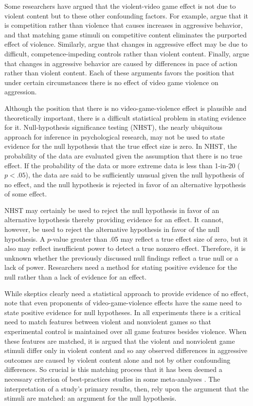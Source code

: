 \documentclass[man]{apa6}
\begin{document}
Some researchers have argued that the violent-video game effect is not due to violent content but to these other confounding factors.  For example, \citet{Adachi:Willoughby:2011} argue that it is competition rather than violence that causes increases in aggressive behavior, and that matching game stimuli on competitive content eliminates the purported effect of violence. Similarly, \citet{Przybylski:etal:2014} argue that changes in aggressive effect may be due to difficult, competence-impeding controls rather than violent content. Finally,  \citet{Elson:etal:2013} argue that changes in aggressive behavior are caused by differences in pace of action rather than violent content. Each of these arguments favors the position that under certain circumstances there is no effect of video game violence on aggression.

Although the position that there is no video-game-violence effect is plausible and theoretically important, there is a difficult statistical problem in stating evidence for it. Null-hypothesis significance testing (NHST), the nearly ubiquitous approach for inference in psychological research, may not be used to state evidence for the null hypothesis that the true effect size is zero.  In NHST, the probability of the data are evaluated given the assumption that there is no true effect. If the probability of the data or more extreme data is less than 1-in-20 ($p<.05$), the data are said to be sufficiently unusual given the null hypothesis of no effect, and the null hypothesis is rejected in favor of an alternative hypothesis of some effect.

NHST may certainly be used to reject the null hypothesis in favor of an alternative hypothesis thereby providing evidence for an effect.  It cannot, however, be used to  reject the alternative hypothesis in favor of the null hypothesis. A $p$-value greater than .05 may reflect a true effect size of zero, but it also may reflect insufficient power to detect a true nonzero effect. Therefore, it is unknown whether the previously discussed null findings reflect a true null or a lack of power.  Researchers need a method for stating positive evidence for the null rather than a lack of evidence for an effect.

While skeptics clearly need a statistical approach to provide evidence of no effect, note that even proponents of video-game-violence effects have the same need to state positive evidence for null hypotheses.  In all experiments there is a critical need to match features between violent and nonviolent games so that experimental control is maintained over all game features besides violence.  When these features are matched, it is argued that the violent and nonviolent game stimuli differ only in violent content and so any observed differences in aggressive outcomes are caused by violent content alone and not by other confounding differences.  So crucial is this matching process that it has been deemed a necessary criterion of best-practices studies in some meta-analyses \citep{Anderson:etal:2010}. The interpretation of a study's primary results, then, rely upon the argument that the stimuli are matched: an argument for the null hypothesis.  
\end{document}
